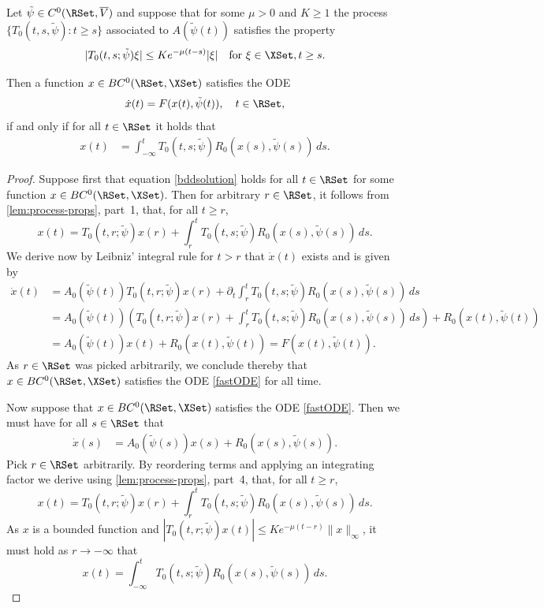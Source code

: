 \documentclass[a4paper]{siamart190516}
\begin{document}
 \begin{lemma}\label{lem:bdd-sol-eqv}
Let $\tilde{\psi} \in C^0(\RSet,\overline{V})$ and suppose that for some $\mu > 0$ and  $K \geq 1$ the process $\{ T_0(t,s, \tilde{\psi}): t \geq s \}$ associated to $A(\tilde{\psi}(t))$  satisfies the property 
\[
| T_0(t,s; \tilde{\psi}) \xi | \leq K e^{-\mu(t-s)} |\xi| \quad \text{for } \xi \in \XSet, t \geq s.
\]

 Then a function $x \in BC^0(\RSet, \XSet)$ satisfies the ODE
\begin{equation}\label{fastODE}
\dot{x}(t) = F(x(t),\tilde{\psi}(t)), \quad t \in \RSet,
\end{equation}
if and only if for all $t \in \RSet$ it holds that
\begin{align}\label{bddsolution}
x(t) &=  \int_{-\infty}^t T_0(t,s; \tilde{\psi}) R_0(x(s),\tilde{\psi}(s)) \, ds.
\end{align}
\end{lemma} 

 \begin{proof}
Suppose first that equation \cref{bddsolution} holds for all $t \in \RSet$ for some
function $x \in BC^0(\RSet,\XSet)$. Then for arbitrary $r \in \RSet$, it follows from
\cref{lem:process-props}, part~1, that, for all $t \geq r$,
\[
x(t)  = T_0(t,r; \tilde{\psi}) x(r) + \int_r^t T_0(t,s;\tilde{\psi}) R_0(x(s),\tilde{\psi}(s)) \, ds.
\]
We derive now by Leibniz' integral rule for $t > r$ that $\dot{x}(t)$ exists and is given by
\begin{align*}
\dot{x}(t) &= A_0(\tilde{\psi}(t)) T_0(t,r;\tilde{\psi})  x(r)+ \partial_t \int_r^t T_0(t,s;\tilde{\psi})  R_0(x(s),\tilde{\psi}(s)) \, ds  \\
&= A_0(\tilde{\psi}(t))  \left( T_0(t,r; \tilde{\psi})  x(r) + \int_r^t T_0(t,s;\tilde{\psi})  R_0(x(s),\tilde{\psi}(s)) \, ds \right) + R_0(x(t),\tilde{\psi}(t))  \\
&= A_0(\tilde{\psi}(t)) x(t) + R_0(x(t),\tilde{\psi}(t)) = F(x(t),\tilde{\psi}(t)).
\end{align*}
As $r \in \RSet$ was picked arbitrarily, we conclude thereby that $x  \in BC^0(\RSet,\XSet)$ satisfies the ODE \cref{fastODE} for all time.

Now suppose that $x  \in BC^0(\RSet,\XSet)$ satisfies the ODE \cref{fastODE}. Then we must have for all $s \in \RSet$ that
\begin{align*}
\dot{x}(s) & = A_0(\tilde{\psi}(s)) x(s) + R_0(x(s),\tilde{\psi}(s)).
\end{align*}
Pick $r \in \RSet$ arbitrarily. By reordering terms and applying an integrating factor we derive using
\cref{lem:process-props}, part~4, that, for all $t \geq r$, 
\[
x(t)  = T_0(t,r; \tilde{\psi}) x(r) +  \int_r^t T_0(t,s; \tilde{\psi}) R_0(x(s),\tilde{\psi}(s)) \, ds.
\]
As $x$ is a bounded function and $|T_0(t,r; \tilde{\psi}) x(t) | \leq K e^{-\mu(t-r)} \| x \|_{\infty} $, it must hold as $r \rightarrow -\infty$ that
\[
x(t) = \int_{-\infty}^t T_0(t,s;\tilde{\psi}) R_0(x(s),\tilde{\psi}(s)) \, ds.
\]
 \end{proof}
 
\end{document}
